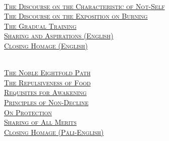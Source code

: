 {  {\libertinusFont\selectfont\textbf{\textsc{\ifafive\fontsize{18}{12}\fi\ifninebythirteen\fontsize{13}{8.5}\fi\ifbfive\fontsize{22}{18}\fi\selectfont{}}}}\\
  \textsc{\ifafive\fontsize{14.4}{28}\fi\ifninebythirteen\fontsize{8.7}{17}\fi\ifbfive\fontsize{16}{33.5}\fi\selectfont
    \hyperref[characteristic-of-not-self]{The Discourse on the Characteristic of Not-Self} \ifdigital\else\pageref{characteristic-of-not-self}\fi\\
    \hyperref[exposition-on-burning]{The Discourse on the Exposition on Burning} \ifdigital\else\pageref{exposition-on-burning}\fi\\
    \hyperref[gradual-training]{The Gradual Training} \ifdigital\else\pageref{gradual-training}\fi\\
    \hyperref[sharing-aspirations]{Sharing and Aspirations (English)} \ifdigital\else\pageref{sharing-aspirations}\fi\\
    \hyperref[closing-homage]{Closing Homage (English)} \ifdigital\else\pageref{closing-homage}\fi\\
  }

  \clearpage

  {\libertinusFont\selectfont\textbf{\textsc{\ifafive\fontsize{18}{12}\fi\ifninebythirteen\fontsize{13}{8.5}\fi\ifbfive\fontsize{22}{18}\fi\selectfont{}}}}\\

\textsc{\ifafive\fontsize{14.4}{28}\fi\ifninebythirteen\fontsize{8.7}{17}\fi\ifbfive\fontsize{16}{33.5}\fi\selectfont
    \hyperref[noble-eightfold-path]{The Noble Eightfold Path} \ifdigital\else\pageref{noble-eightfold-path}\fi\\
    \hyperref[repulsiveness-of-food]{The Repulsiveness of Food} \ifdigital\else\pageref{repulsiveness-of-food}\fi\\
    \hyperref[requisites-for-awakening]{Requisites for Awakening} \ifdigital\else\pageref{requisites-for-awakening}\fi\\
    \hyperref[principles-of-non-decline]{Principles of Non-Decline} \ifdigital\else\pageref{principles-of-non-decline}\fi\\
    \hyperref[protection]{On Protection} \ifdigital\else\pageref{protection}\fi\\
    \hyperref[sharing-all-merits]{Sharing of All Merits} \ifdigital\else\pageref{sharing-all-merits}\fi\\
    \hyperref[closing-homage]{Closing Homage (Pāli-English)} \ifdigital\else\pageref{closing-homage}\fi\\
  }

}
